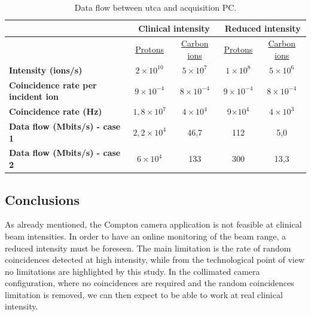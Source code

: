 {\begin{table} [!htbp]
\centering
\caption{Data flow between \gls{utca} and acquisition PC.}
\label{chapappA::tab::dataFlowuTCAPC}
\begin{tabular}{m{3.5cm} c c c c}
\toprule
\rowcolor{myColorMainA!20}
		&\multicolumn{2}{c}{	\textbf{Clinical intensity}} &\multicolumn{2}{c}{ \textbf{Reduced intensity}} \\
\midrule
		& \underline{Protons}& \underline{Carbon ions} & \underline{Protons}& \underline{Carbon ions} \\
\midrule
\textbf{Intensity (ions/s)}		& $2\times10^{10}$	&$5\times10^{7}$  & $1\times10^{8}$& $5\times10^{6}$\\
\textbf{Coincidence rate per incident ion}		& $9\times10^{-4}$&  $8\times10^{-4}$&  $9\times10^{-4}$& $8\times10^{-4}$ \\
\textbf{Coincidence rate (Hz)}		& $1,8\times10^{7}$&  $4\times10^{4}$&  9$\times10^{4}$& $4\times10^{3}$\\
\textbf{Data flow (Mbits/s) - case 1}		&$2,2\times10^{4}$ &  46,7&  112& 5,0\\
\textbf{Data flow (Mbits/s) - case 2}		& $6\times10^{4}$&  133&  300& 13,3\\
\bottomrule
\end{tabular}
\end{table}

\subsection{Conclusions}\label{chapappA::subsec::conclusions}

As already mentioned, the Compton camera application is not feasible at clinical beam intensities. \newline
In order to have an online monitoring of the beam range, a reduced intensity must be foreseen. The main limitation is the rate of random coincidences detected at high intensity, while from the technological point of view no limitations are highlighted by this study. In the collimated camera configuration, where no coincidences are required and the random coincidences limitation is removed, we can then expect to be able to work at real clinical intensity.



}
